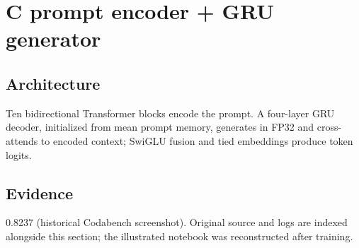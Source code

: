 \section{C prompt encoder + GRU generator}
\subsection{Architecture} Ten bidirectional Transformer blocks encode the prompt. A four-layer GRU decoder, initialized from mean prompt memory, generates in FP32 and cross-attends to encoded context; SwiGLU fusion and tied embeddings produce token logits.
\subsection{Evidence} 0.8237 (historical Codabench screenshot). Original source and logs are indexed alongside this section; the illustrated notebook was reconstructed after training.
